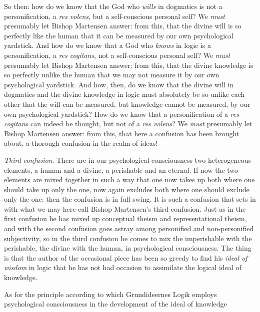 \documentclass[12pt]{book}
\newcommand{\opage}[1]{\marginnote{\footnotesize\textit{[#1]}}}
\begin{document}
So then: how do we know that the God who \emph{wills} in dogmatics is not a personification, a \textit{res volens}, but a self-conscious personal self? We \emph{must} presumably let Bishop Martensen answer: from this, that the divine will is so perfectly like the human that it can be measured by our own
\opage{124}\setcounter{footnote}{0}%
psychological yardstick. And how do we know that a God who \emph{knows} in logic is a personification, a \textit{res cogitans}, not a self-conscious personal self? We \emph{must} presumably let Bishop Martensen answer: from this, that the divine knowledge is so perfectly unlike the human that we may not measure it by our own psychological yardstick. And how, then, do we know that the divine will in dogmatics and the divine knowledge in logic must absolutely be so unlike each other that the will can be measured, but knowledge cannot be measured, by our own psychological yardstick? How do we know that a personification of a \textit{res cogitans} can indeed be thought, but not of a \textit{res volens}? We \emph{must} presumably let Bishop Martensen answer: from this, that here a confusion has been brought about, a thorough confusion in the realm of ideas!

\emph{Third confusion}. There are in our psychological consciousness two heterogeneous elements, a human and a divine, a perishable and an eternal. If now the two elements are mixed together in such a way that one now takes up both where one should take up only the one, now again excludes both where one should exclude only the one: then the confusion is in full swing. It is such a confusion that sets in with what we may here call Bishop Martensen's third confusion. Just as in the first confusion he has mixed up conceptual theism and representational theism, and with the second confusion goes astray among personified and non-personified subjectivity, so in the third confusion he comes to mix the imperishable with the perishable, the divine with the human, in psychological consciousness. The thing is that the author of the occasional piece has been so greedy to find his \emph{ideal of wisdom} in logic that he has not had occasion to assimilate the logical ideal of knowledge.

As for the principle according to which Grundideernes Logik employs psychological consciousness in the development of the ideal of knowledge
\end{document}

